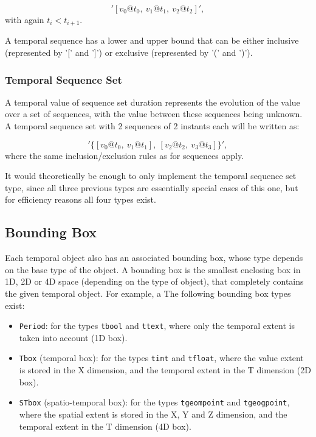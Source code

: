 \[
    '[v_0@t_0,\ v_1@t_1,\ v_2@t_2]',
\]
with again \(t_i < t_{i+1}\).

A temporal sequence has a lower and upper bound that can be either inclusive (represented by '[' and ']') or exclusive (represented by '(' and ')').

\subsubsection{Temporal Sequence Set}
\label{section:mobilitydb_s}

A temporal value of sequence set duration represents the evolution of the value over a set of sequences, with the value between these sequences being unknown. A temporal sequence set with 2 sequences of 2 instants each will be written as:

\[
    '\{[v_0@t_0,\ v_1@t_1],\ [v_2@t_2,\ v_3@t_3]\}',
\]
where the same inclusion/exclusion rules as for sequences apply.

It would theoretically be enough to only implement the temporal sequence set type, since all three previous types are essentially special cases of this one, but for efficiency reasons all four types exist.

\subsection{Bounding Box}
\label{section:mobilitydb_bbox}

Each temporal object also has an associated bounding box, whose type depends on the base type of the object. A bounding box is the smallest enclosing box in 1D, 2D or 4D space (depending on the type of object), that completely contains the given temporal object. For example, a  The following bounding box types exist:

\begin{itemize}
    \item \lstinline{Period}: for the types \lstinline{tbool} and \lstinline{ttext}, where only the temporal extent is taken into account (1D box).
    \item \lstinline{Tbox} (temporal box): for the types \lstinline{tint} and \lstinline{tfloat}, where the value extent is stored in the X dimension, and the temporal extent in the T dimension (2D box).
    \item \lstinline{STbox} (spatio-temporal box): for the types \lstinline{tgeompoint} and \lstinline{tgeogpoint}, where the spatial extent is stored in the X, Y and Z dimension, and the temporal extent in the T dimension (4D box).
\end{itemize}

